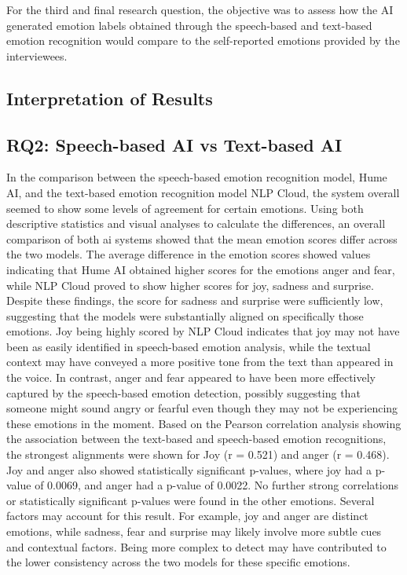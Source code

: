For the third and final research question, the objective was to assess how the AI generated emotion labels obtained through the speech-based and text-based emotion recognition would compare to the self-reported emotions provided by the interviewees.

\subsection{Interpretation of Results}
\subsection{RQ2: Speech-based AI vs Text-based AI}
In the comparison between the speech-based emotion recognition model, Hume AI, and the text-based emotion recognition model NLP Cloud, the system overall seemed to show some levels of agreement for certain emotions. Using both descriptive statistics and visual analyses to calculate the differences, an overall comparison of both ai systems showed that the mean emotion scores differ across the two models.
The average difference in the emotion scores showed values indicating that Hume AI obtained higher scores for the emotions anger and fear, while NLP Cloud proved to show higher scores for joy, sadness and surprise. Despite these findings, the score for sadness and surprise were sufficiently low, suggesting that the models were substantially aligned on specifically those emotions.
Joy being highly scored by NLP Cloud indicates that joy may not have been as easily identified in speech-based emotion analysis, while the textual context may have conveyed a more positive tone from the text than appeared in the voice. In contrast, anger and fear appeared to have been more effectively captured by the speech-based emotion detection, possibly suggesting that someone might sound angry or fearful even though they may not be experiencing these emotions in the moment.
Based on the Pearson correlation analysis showing the association between the text-based and speech-based emotion recognitions, the strongest alignments were shown for Joy (r = 0.521) and anger (r = 0.468). Joy and anger also showed statistically significant p-values, where joy had a p-value of 0.0069, and anger had a p-value of 0.0022. No further strong correlations or statistically significant p-values were found in the other emotions.
Several factors may account for this result. For example, joy and anger are distinct emotions, while sadness, fear and surprise may likely involve more subtle cues and contextual factors. Being more complex to detect may have contributed to the lower consistency across the two models for these specific emotions.

